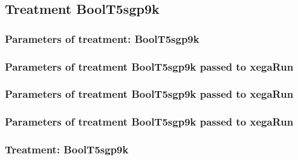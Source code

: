 \documentclass[18pt,c]{beamer}
\begin{document}
\clearpage
\subsection{Treatment BoolT5sgp9k}

 \begin{frame}
 \fontsize{8pt}{9pt}\selectfont
 \frametitle{  Parameters of treatment: BoolT5sgp9k 
 }

 \label{ExpFtParmTable040.tex}  
 \end{frame}


 \begin{frame}
 \fontsize{8pt}{9pt}\selectfont
 \frametitle{  Parameters of treatment BoolT5sgp9k passed to xegaRun
 }

 \label{ExpFtParmTable041.tex}  
 \end{frame}


 \begin{frame}
 \fontsize{8pt}{9pt}\selectfont
 \frametitle{  Parameters of treatment BoolT5sgp9k passed to xegaRun
 }

 \label{ExpFtParmTable042.tex}  
 \end{frame}


 \begin{frame}
 \fontsize{8pt}{9pt}\selectfont
 \frametitle{  Parameters of treatment BoolT5sgp9k passed to xegaRun
 }

 \label{ExpFtParmTable043.tex}  
 \end{frame}

 \begin{frame}
 \fontsize{8pt}{9pt}\selectfont
 \frametitle{ Treatment: BoolT5sgp9k }

 \label{ExpFStatsTable013.tex}  
 \end{frame}
\end{document}
